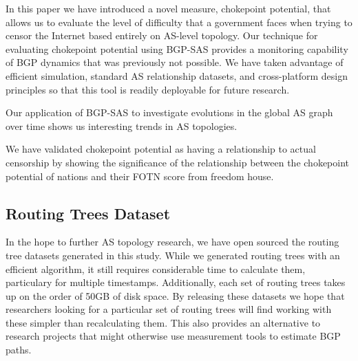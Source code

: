 \documentclass[10pt, conference, letterpaper]{IEEEtran}
\newcommand{\toolname}{BGP-SAS }
\begin{document}
In this paper we have introduced a novel measure, chokepoint potential, that allows us to
evaluate the level of difficulty that a government faces when trying to censor the Internet
based entirely on AS-level topology. Our technique for evaluating chokepoint potential using
\toolname provides a monitoring capability of BGP dynamics that was previously not possible.
We have taken advantage of efficient simulation, standard AS relationship datasets, and cross-platform
design principles so that this tool is readily deployable for future research.
\par
Our application of \toolname to investigate evolutions in the global AS graph over time shows us
interesting trends in AS topologies.
\par
We have validated chokepoint potential as having a relationship to actual censorship by showing
the significance of the relationship between the chokepoint potential of nations and their FOTN
score from freedom house.

\subsection{Routing Trees Dataset}
In the hope to further AS topology research, we have open sourced the routing tree datasets generated in this study. While we generated routing trees
with an efficient algorithm, it still requires considerable time to calculate them, particulary for multiple timestamps. Additionally, each set of routing trees
takes up on the order of 50GB of disk space. By releasing these datasets we hope that researchers looking for a particular set of routing trees will find
working with these simpler than recalculating them. This also provides an alternative to research projects that might otherwise use measurement tools to estimate
BGP paths.

\end{document}
